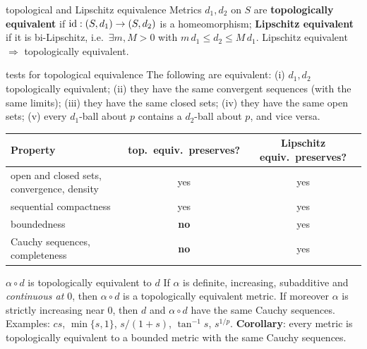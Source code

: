 \begin{defn}{topological and Lipschitz equivalence}
Metrics $d_1,d_2$ on $S$ are \textbf{topologically equivalent} if
$\operatorname{id}:(S,d_1)\to(S,d_2)$ is a homeomorphism; \textbf{Lipschitz equivalent} if it is
bi-Lipschitz, i.e.\ $\exists m,M>0$ with $m\,d_1\le d_2\le M\,d_1$.
Lipschitz equivalent $\Rightarrow$ topologically equivalent.
\end{defn}
\begin{thm}{tests for topological equivalence}
The following are equivalent: (i) $d_1,d_2$ topologically equivalent; (ii) they have the same
convergent sequences (with the same limits); (iii) they have the same closed sets; (iv) they have
the same open sets; (v) every $d_1$-ball about $p$ contains a $d_2$-ball about $p$, and vice versa.
\end{thm}
\begin{center}
\renewcommand{\arraystretch}{1.2}
\begin{tabular}{@{}lcc@{}}\toprule
Property & top.\ equiv.\ preserves? & Lipschitz equiv.\ preserves?\\\midrule
open and closed sets, convergence, density & yes & yes\\
sequential compactness & yes & yes\\
boundedness & \textbf{no} & yes\\
Cauchy sequences, completeness & \textbf{no} & yes\\\bottomrule
\end{tabular}
\end{center}

\begin{thm}{$\alpha\circ d$ is topologically equivalent to $d$}
If $\alpha$ is definite, increasing, subadditive and \emph{continuous at $0$}, then $\alpha\circ
d$ is a topologically equivalent metric. If moreover $\alpha$ is strictly increasing near $0$,
then $d$ and $\alpha\circ d$ have the same Cauchy sequences. Examples: $cs$, $\min\{s,1\}$,
$s/(1+s)$, $\tan^{-1}s$, $s^{1/p}$. \textbf{Corollary}: every metric is topologically equivalent
to a bounded metric with the same Cauchy sequences.
\end{thm}

